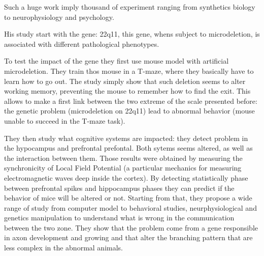 \documentclass[10pt,letterpaper]{article}
\begin{document}
Such a huge work imply thousand of experiment ranging from synthetics biology to neurophysiology and psychology. 


His study start with the gene: 22q11, this gene, whens subject to microdeletion, is associated with different pathological phenotypes.

To test the impact of the gene they first use mouse model with artificial microdeletion. They train thos mouse in a T-maze, where they basically have to learn how to go out. The study simply show that such deletion seems to alter working memory, preventing the mouse to remember how to find the exit. This allows to make a first link between the two extreme of the scale presented before: the genetic problem (microdeletion on 22q11) lead to abnormal behavior (mouse unable to succeed in the T-maze task). 


They then study what cognitive systems are impacted: they detect problem in the  hypocampus and prefrontal prefontal. Both sytems seems altered, as well as the interaction between them. Those results were obtained by measuring the synchronicity of Local Field Potential (a particular mechanics for measuring electromagnetic waves deep inside the cortex). 
By detecting statistically phase between prefrontal spikes and hippocampus phases they can predict if the behavior of mice will be altered or not. 
Starting from that, they propose a wide range of study from computer model to behavioral studies, neurphysiological and genetics manipulation to understand what is wrong in the communication between the two zone.  They show that the problem come from a gene responsible in axon development and growing and that alter the branching pattern that are less complex in the abnormal animals.




%
\end{document}
